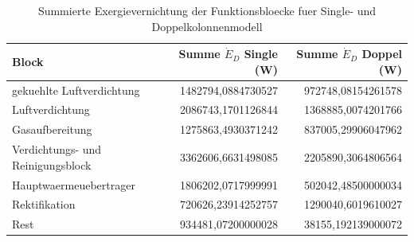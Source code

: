 \begin{longtable}{lrr}
\caption{Summierte Exergievernichtung der Funktionsbloecke fuer Single- und Doppelkolonnenmodell} \\
\hline
Block & Summe $\dot{E}_D$ Single (W) & Summe $\dot{E}_D$ Doppel (W) \\
\hline
gekuehlte Luftverdichtung & 1482794,0884730527 & 972748,08154261578 \\
Luftverdichtung & 2086743,1701126844 & 1368885,0074201766 \\
Gasaufbereitung & 1275863,4930371242 & 837005,29906047962 \\
Verdichtungs- und Reinigungsblock & 3362606,6631498085 & 2205890,3064806564 \\
Hauptwaermeuebertrager & 1806202,0717999991 & 502042,48500000034 \\
Rektifikation & 720626,23914252757 & 1290040,6019610027 \\
Rest & 934481,07200000028 & 38155,192139000072 \\
\hline
\end{longtable}